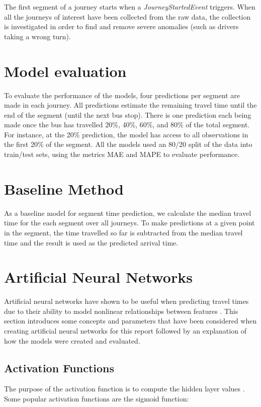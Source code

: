 The first segment of a journey starts when a \textit{JourneyStartedEvent} triggers. When all the journeys of interest have been collected from the raw data, the collection is investigated in order to find and remove severe anomalies (such as drivers taking a wrong turn). 

\section{Model evaluation}
To evaluate the performance of the models, four predictions per segment are made in each journey. All predictions estimate the remaining travel time until the end of the segment (until the next bus stop). There is one prediction each being made once the bus has travelled 20\%, 40\%, 60\%, and 80\% of the total segment. For instance, at the 20\% prediction, the model has access to all observations in the first 20\% of the segment. All the models used an 80/20 split of the data into train/test sets, using the metrics MAE and MAPE to evaluate performance.

\section{Baseline Method}
As a baseline model for segment time prediction, we calculate the median travel time for the each segment over all journeys. To make predictions at a given point in the segment, the time travelled so far is subtracted from the median travel time and the result is used as the predicted arrival time.

\section{Artificial Neural Networks}

Artificial neural networks have shown to be useful when predicting travel times due to their ability to model nonlinear relationships between features \cite{brazilANN}\cite{malaysiaANN}. This section introduces some concepts and parameters that have been considered when creating artificial neural networks for this report followed by an explanation of how the models were created and evaluated.

\subsection{Activation Functions}
The purpose of the activation function is to compute the hidden layer values \cite{Goodfellow-et-al-2016}. Some popular activation functions are the sigmoid function:

